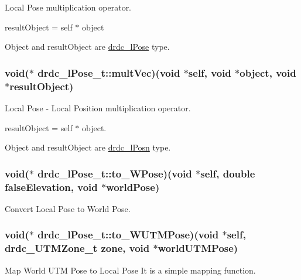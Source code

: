 Local Pose multiplication operator. 

resultObject = self $\ast$ object

Object and resultObject are \hyperlink{classdrdc__lPose}{drdc\_\-lPose} type. \hypertarget{structdrdc__lPose__t_a745ee51417233f421a1b7070d07aa47}{
\subsubsection[multVec]{\setlength{\rightskip}{0pt plus 5cm}void($\ast$ {\bf drdc\_\-lPose\_\-t::multVec})(void $\ast$self, void $\ast$object, void $\ast$resultObject)}}
\label{structdrdc__lPose__t_a745ee51417233f421a1b7070d07aa47}


Local Pose - Local Position multiplication operator. 

resultObject = self $\ast$ object.

Object and resultObject are \hyperlink{classdrdc__lPosn}{drdc\_\-lPosn} type. \hypertarget{structdrdc__lPose__t_2f2d7db92fa938afae79e7068b5eded6}{
\subsubsection[to\_\-WPose]{\setlength{\rightskip}{0pt plus 5cm}void($\ast$ {\bf drdc\_\-lPose\_\-t::to\_\-WPose})(void $\ast$self, double falseElevation, void $\ast$worldPose)}}
\label{structdrdc__lPose__t_2f2d7db92fa938afae79e7068b5eded6}


Convert Local Pose to World Pose. 

\hypertarget{structdrdc__lPose__t_380cbf9027e090e6e630130be267726e}{
\subsubsection[to\_\-WUTMPose]{\setlength{\rightskip}{0pt plus 5cm}void($\ast$ {\bf drdc\_\-lPose\_\-t::to\_\-WUTMPose})(void $\ast$self, {\bf drdc\_\-UTMZone\_\-t} zone, void $\ast$worldUTMPose)}}
\label{structdrdc__lPose__t_380cbf9027e090e6e630130be267726e}


Map World UTM Pose to Local Pose It is a simple mapping function. 

